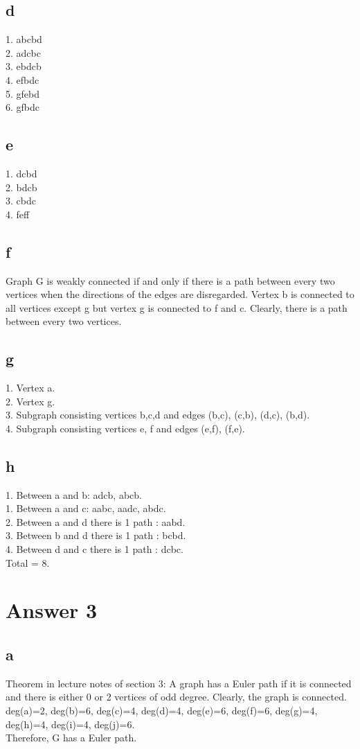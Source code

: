 \documentclass[11pt]{article}
\begin{document}
\subsection*{d}
1. abcbd\\
2. adcbc\\
3. ebdcb\\
4. efbdc\\
5. gfebd\\
6. gfbdc
\subsection*{e}
1. dcbd\\
2. bdcb\\
3. cbdc\\
4. feff
\subsection*{f}
Graph G is weakly connected if and only if there is a path between every two vertices when the directions of the edges are disregarded. Vertex b is connected to all vertices except g but vertex g is connected to f and c. Clearly, there is a path between every two vertices.
\subsection*{g}
1. Vertex a.\\
2. Vertex g.\\
3. Subgraph consisting vertices b,c,d and edges (b,c), (c,b), (d,c), (b,d).\\
4. Subgraph consisting vertices e, f and edges (e,f), (f,e). 
\subsection*{h}
1. Between a and b: adcb, abcb.\\
1. Between a and c: aabc, aadc, abdc.\\
2. Between a and d there is 1 path : aabd.\\
3. Between b and d there is 1 path : bcbd.\\
4. Between d and c there is 1 path : dcbc.\\
Total = 8.
\section*{Answer 3}
\subsection*{a}
Theorem in lecture notes of section 3: A graph has a Euler path if it is connected and there is either 0 or 2 vertices of odd degree. Clearly, the graph is connected.\\
deg(a)=2, deg(b)=6, deg(c)=4, deg(d)=4, deg(e)=6, deg(f)=6, deg(g)=4, deg(h)=4, deg(i)=4, deg(j)=6. \\
Therefore, G has a Euler path.
\end{document}
